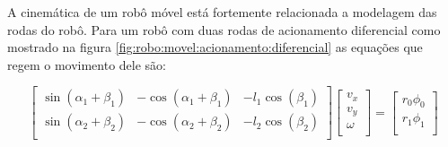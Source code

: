 A cinemática de um robô móvel está fortemente relacionada a modelagem
das rodas do robô. Para um robô com duas rodas de acionamento diferencial
como mostrado na figura \ref{fig:robo:movel:acionamento:diferencial}
as equações que regem o movimento dele são:

\[
\begin{bmatrix}
    \sin(\alpha_{1} + \beta_{1}) &  -\cos(\alpha_{1} + \beta_{1}) &  -l_1\cos(\beta_{1})\\
    \sin(\alpha_{2} + \beta_{2}) &  -\cos(\alpha_{2} + \beta_{2}) &  -l_2\cos(\beta_{2})\\
\end{bmatrix}
\begin{bmatrix}
    v_x \\
    v_y \\
    \omega\\
\end{bmatrix}
=
\begin{bmatrix}
    r_0\phi_0 \\
    r_1\phi_1 \\
\end{bmatrix}
\]


